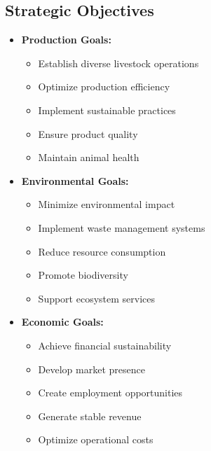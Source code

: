 \subsection{Strategic Objectives}
\begin{itemize}
    \item \textbf{Production Goals:}
    \begin{itemize}
        \item Establish diverse livestock operations
        \item Optimize production efficiency
        \item Implement sustainable practices
        \item Ensure product quality
        \item Maintain animal health
    \end{itemize}
    
    \item \textbf{Environmental Goals:}
    \begin{itemize}
        \item Minimize environmental impact
        \item Implement waste management systems
        \item Reduce resource consumption
        \item Promote biodiversity
        \item Support ecosystem services
    \end{itemize}
    
    \item \textbf{Economic Goals:}
    \begin{itemize}
        \item Achieve financial sustainability
        \item Develop market presence
        \item Create employment opportunities
        \item Generate stable revenue
        \item Optimize operational costs
    \end{itemize}
\end{itemize}

